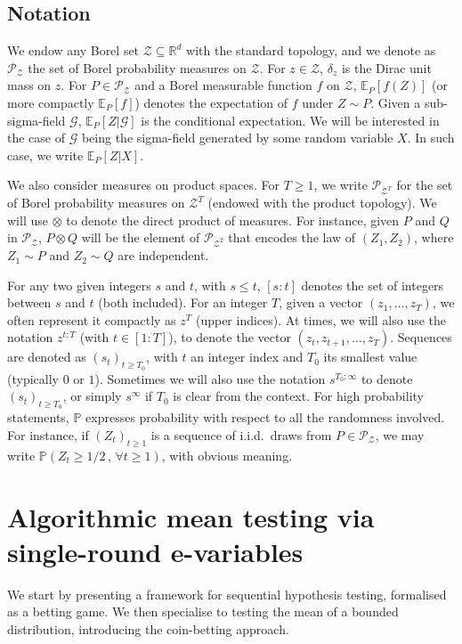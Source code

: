 \documentclass[3p, authoryear, 10pt]{elsarticle}%
\newcommand{\E}{\mathbb E}
\newcommand{\Pp}{\mathbb P}
\newcommand{\PR}{\mathcal P}
\newcommand{\R}{\mathbb R}
\newcommand{\Z}{\mathcal Z}
\begin{document}
\subsection*{Notation}
We endow any Borel set $\Z\subseteq\R^d$ with the standard topology, and we denote as $\PR_\Z$ the set of Borel probability measures on $\Z$. For $z\in\Z$, $\delta_z$ is the Dirac unit mass on $z$. For $P\in\PR_\Z$ and a Borel measurable function $f$ on $\Z$, $\E_P[f(Z)]$ (or more compactly $\E_P[f]$) denotes the expectation of $f$ under $Z\sim P$. Given a sub-sigma-field $\mathcal G$, $\E_P[Z|\mathcal G]$ is the conditional expectation. We will be interested in the case of $\mathcal G$ being the sigma-field generated by some random variable $X$. In such case, we write $\E_P[Z|X]$. 

We  also consider measures on product spaces. For $T\geq 1$, we write $\PR_{\Z^T}$ for the set of Borel probability measures on $\Z^T$ (endowed with the product topology). We will use $\otimes$ to denote the direct product of measures. For instance, given $P$ and $Q$ in $\PR_\Z$, $P\otimes Q$ will be the element of $\PR_{\Z^2}$ that encodes the law of $(Z_1,Z_2)$, where $Z_1\sim P$ and $Z_2\sim Q$ are independent. 

For any two given integers $s$ and $t$, with $s\leq t$, $[s:t]$ denotes the set of integers between $s$ and $t$ (both included). For an integer $T$, given a vector $(z_1, \dots, z_T)$, we often represent it compactly as $z^T$ (upper indices). At times, we will also use the notation $z^{t:T}$ (with $t\in[1:T]$), to denote the vector $(z_t, z_{t+1}, \dots, z_T)$. Sequences are denoted as $(s_t)_{t\geq T_0}$, with $t$ an integer index and $T_0$ its smallest value (typically $0$ or $1$). Sometimes we will also use the notation $s^{T_0:\infty}$ to denote $(s_t)_{t\geq T_0}$, or simply $s^\infty$ if $T_0$ is clear from the context. For high probability statements, $\Pp$ expresses probability with respect to all the randomness involved. For instance, if $(Z_t)_{t\geq 1}$ is a sequence of i.i.d.\ draws from  $P\in\PR_\Z$, we may write $\Pp(Z_t\geq1/2\,,\,\forall t\geq 1)$, with obvious meaning.

\section{Algorithmic mean testing via single-round e-variables}\label{sec:ame}
We start by presenting a framework for sequential hypothesis testing, formalised as a betting game. We then specialise to testing the mean of a bounded distribution, introducing the coin-betting approach.
\end{document}
